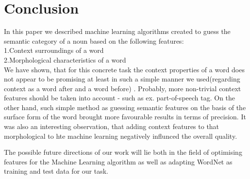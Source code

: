 \documentclass[letterpaper]{article}
\begin{document}
\section{Conclusion}
In this paper we described machine learning algorithms
created to guess the semantic category of a noun based on the following features:\\
1.Context surroundings of a word\\
2.Morphological characteristics of a word\\
We have shown, that for this concrete task the context properties of a word
does not appear to be promising at least in such a simple manner we 
used(regarding context as a word after and a word before) .
Probably, more non-trivial context features should be taken into account 
- such as ex. part-of-speech tag.
On the other hand, such simple method as guessing semantic features on the
basis of the surface form of the word brought more favourable %
results in terms of precision. It was also an interesting observation, that 
adding context features to that morphological to hte machine learning
negatively influnced the overall quality.

The possible future directions of our work will lie both in the field of
optimising features for the Machine Learning algorithm as well as 
adapting WordNet as training and test data for our task.

 
\end{document}

